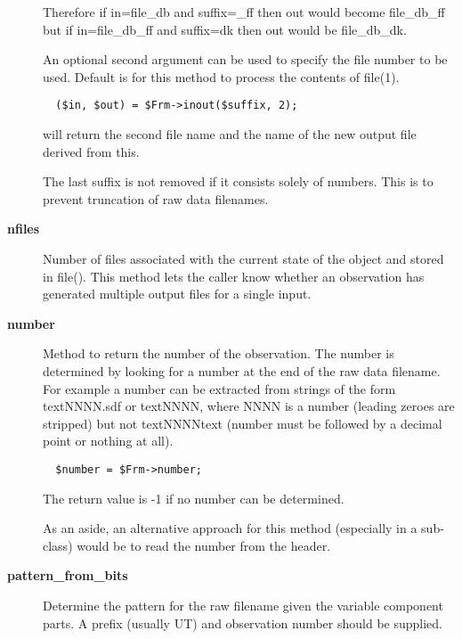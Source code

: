 \begin{description}
Therefore if in=file\_db and suffix=\_ff then out would
become file\_db\_ff but if in=file\_db\_ff and suffix=dk then
out would be file\_db\_dk.



An optional second argument can be used to specify the
file number to be used. Default is for this method to process
the contents of file(1).

\begin{verbatim}
  ($in, $out) = $Frm->inout($suffix, 2);
\end{verbatim}


will return the second file name and the name of the new output
file derived from this.



The last suffix is not removed if it consists solely of numbers.
This is to prevent truncation of raw data filenames.


\item[\textbf{nfiles}] \mbox{}

Number of files associated with the current state of the object and
stored in file(). This method lets the caller know whether an
observation has generated multiple output files for a single input.


\item[\textbf{number}] \mbox{}

Method to return the number of the observation. The number is
determined by looking for a number at the end of the raw data
filename.  For example a number can be extracted from strings of the
form textNNNN.sdf or textNNNN, where NNNN is a number (leading zeroes
are stripped) but not textNNNNtext (number must be followed by a decimal
point or nothing at all).

\begin{verbatim}
  $number = $Frm->number;
\end{verbatim}


The return value is -1 if no number can be determined.



As an aside, an alternative approach for this method (especially
in a sub-class) would be to read the number from the header.


\item[\textbf{pattern\_from\_bits}] \mbox{}

Determine the pattern for the raw filename given the variable component
parts. A prefix (usually UT) and observation number should
be supplied.


\end{description}
